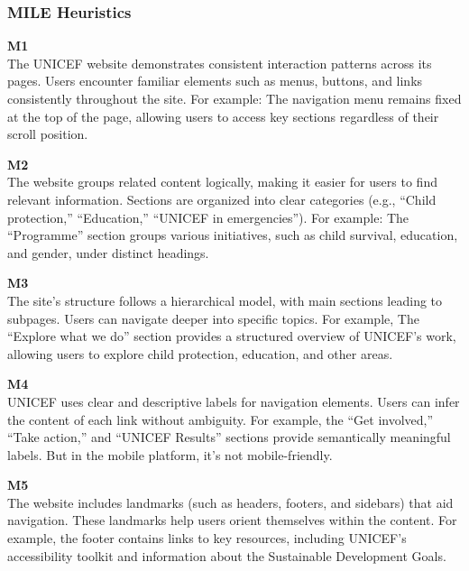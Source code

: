 \subsubsection{MILE Heuristics}
\begin{description}
    \item {\textbf{M1} \color{unicefGray}{Consistency of interaction}}\\
    The UNICEF website demonstrates consistent interaction patterns across its pages. Users encounter familiar elements such as menus, buttons, and links consistently throughout the site. For example: The navigation menu remains fixed at the top of the page, allowing users to access key sections regardless of their scroll position.
    \item {\textbf{M2} \color{unicefGray}{Group navigation}}\\
    The website groups related content logically, making it easier for users to find relevant information. Sections are organized into clear categories (e.g., “Child protection,” “Education,” “UNICEF in emergencies”). For example: The “Programme” section groups various initiatives, such as child survival, education, and gender, under distinct headings.
    \item {\textbf{M3} \color{unicefGray}{Structural navigation}}\\
    The site’s structure follows a hierarchical model, with main sections leading to subpages. Users can navigate deeper into specific topics. For example, The “Explore what we do” section provides a structured overview of UNICEF’s work, allowing users to explore child protection, education, and other areas.
    \item {\textbf{M4} \color{unicefGray}{Semantic navigation}}\\
    UNICEF uses clear and descriptive labels for navigation elements. Users can infer the content of each link without ambiguity. For example, the “Get involved,” “Take action,” and “UNICEF Results” sections provide semantically meaningful labels. But in the mobile platform, it's not mobile-friendly.
    \item {\textbf{M5} \color{unicefGray}{Presence of landmarks}}\\
    The website includes landmarks (such as headers, footers, and sidebars) that aid navigation. These landmarks help users orient themselves within the content. For example, the footer contains links to key resources, including UNICEF’s accessibility toolkit and information about the Sustainable Development Goals.
\end{description}
